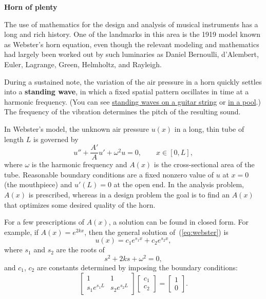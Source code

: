 \documentclass[11pt,twoside]{article}
\begin{document}
   


\begin{center}
    \bf Horn of plenty
\end{center}

The use of mathematics for the design and analysis of musical instruments has a long and rich history. One of the landmarks in this area is the 1919 model known as Webster's horn equation, even though the relevant modeling and mathematics had largely been worked out by such luminaries as Daniel Bernoulli, d'Alembert, Euler, Lagrange, Green, Helmholtz, and Rayleigh. 

During a sustained note, the variation of the air pressure in a horn quickly settles into a \textbf{standing wave}, in which a fixed spatial pattern oscillates in time at a harmonic frequency. (You can see \href{https://youtu.be/ShLDhqM0gR4?si=4enCHV6OBk9-mTs4&t=39}{standing waves on a guitar string} or \href{https://youtu.be/e6JLXZN3Ov0?si=5XwtqKBd3p0g_lzn&t=20}{in a pool}.) The frequency of the vibration determines the pitch of the resulting sound.

In Webster's model, the unknown air pressure $u(x)$ in a long, thin tube of length $L$ is governed by
\begin{equation}
  \label{eq:webster}
  u'' + \frac{A'}{A} u' + \omega^2 u = 0, \qquad x\in [0,L],
\end{equation}
where $\omega$ is the harmonic frequency and $A(x)$ is the cross-sectional area of the tube. Reasonable boundary conditions are a fixed nonzero value of $u$ at $x=0$ (the mouthpiece) and $u'(L)=0$ at the open end. In the analysis problem, $A(x)$ is prescribed, whereas in a design problem the goal is to find an $A(x)$ that optimizes some desired quality of the horn. 

For a few prescriptions of $A(x)$, a solution can be found in closed form. For example, if $A(x)=e^{2k x}$, then the general solution of~(\ref{eq:webster}) is
\begin{equation}
  \label{eq:solution-exp}
  u(x) = c_1 e^{s_1 x} + c_2 e^{s_2 x},
\end{equation}
where $s_1$ and $s_2$ are the roots of 
\begin{equation}
  \label{eq:roots}
  s^2 + 2k s + \omega^2 = 0, 
\end{equation}
and $c_1$, $c_2$ are constants determined by imposing the boundary conditions:
\begin{equation}
  \label{eq:bc}
  \begin{bmatrix}
    1 & 1 \\ s_1 e^{s_1 L} & s_2 e^{s_2 L}
  \end{bmatrix}
  \begin{bmatrix}
    c_1 \\ c_2
  \end{bmatrix}
  =
  \begin{bmatrix}
    1 \\ 0
  \end{bmatrix}.
\end{equation}
\end{document}
